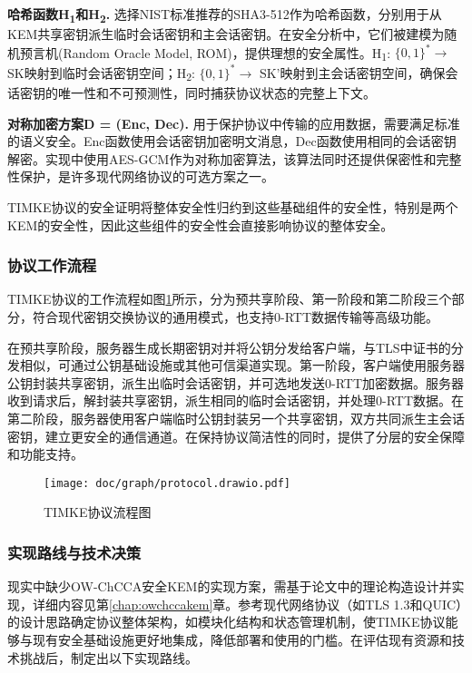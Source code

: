\textbf{哈希函数H\textsubscript{1}和H\textsubscript{2}.} 选择NIST标准推荐的SHA3-512作为哈希函数，分别用于从KEM共享密钥派生临时会话密钥和主会话密钥。在安全分析中，它们被建模为随机预言机(Random Oracle Model, ROM)，提供理想的安全属性。H\textsubscript{1}: $\{0,1\}^* \rightarrow$ SK映射到临时会话密钥空间；H\textsubscript{2}: $\{0,1\}^* \rightarrow$ SK'映射到主会话密钥空间，确保会话密钥的唯一性和不可预测性，同时捕获协议状态的完整上下文。

\textbf{对称加密方案D = (Enc, Dec).} 用于保护协议中传输的应用数据，需要满足标准的语义安全。Enc函数使用会话密钥加密明文消息，Dec函数使用相同的会话密钥解密。实现中使用AES-GCM作为对称加密算法，该算法同时还提供保密性和完整性保护，是许多现代网络协议的可选方案之一。

TIMKE协议的安全证明将整体安全性归约到这些基础组件的安全性，特别是两个KEM的安全性，因此这些组件的安全性会直接影响协议的整体安全。

\subsubsection{协议工作流程}
TIMKE协议的工作流程如图\ref{fig:protocol-flow}所示，分为预共享阶段、第一阶段和第二阶段三个部分，符合现代密钥交换协议的通用模式，也支持0-RTT数据传输等高级功能。

在预共享阶段，服务器生成长期密钥对并将公钥分发给客户端，与TLS中证书的分发相似，可通过公钥基础设施或其他可信渠道实现。第一阶段，客户端使用服务器公钥封装共享密钥，派生出临时会话密钥，并可选地发送0-RTT加密数据。服务器收到请求后，解封装共享密钥，派生相同的临时会话密钥，并处理0-RTT数据。在第二阶段，服务器使用客户端临时公钥封装另一个共享密钥，双方共同派生主会话密钥，建立更安全的通信通道。在保持协议简洁性的同时，提供了分层的安全保障和功能支持。
\begin{figure}[ht]
    \centering
    \texttt{[image: doc/graph/protocol.drawio.pdf]}
    \caption{TIMKE协议流程图}
    \label{fig:protocol-flow}
\end{figure}

\subsubsection{实现路线与技术决策}

现实中缺少OW-ChCCA安全KEM的实现方案，需基于论文\cite{pan_lattice-based_2023}中的理论构造设计并实现，详细内容见第\ref{chap:owchccakem}章。参考现代网络协议（如TLS 1.3和QUIC）的设计思路确定协议整体架构，如模块化结构和状态管理机制，使TIMKE协议能够与现有安全基础设施更好地集成，降低部署和使用的门槛。在评估现有资源和技术挑战后，制定出以下实现路线。


